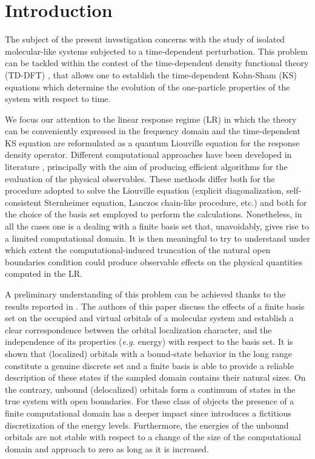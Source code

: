 \documentclass[reprint,aps,prb]{revtex4-1}
\begin{document}
\section{Introduction}

The subject of the present investigation concerns with the study of isolated molecular-like systems subjected to a time-dependent perturbation. %
This problem can be tackled within the contest of the time-dependent density functional theory (TD-DFT) \cite{runge1984,onida2002}, that allows one to establish the time-dependent 
Kohn-Sham (KS) equations which determine the evolution of the one-particle properties of the system with respect to time. 

We focus our attention to the linear response regime (LR) in which the theory can be conveniently expressed in the frequency domain and the time-dependent KS equation are reformulated 
as a quantum Liouville equation for the response density operator. Different computational approaches have been developed in literature \cite{baroni2008,hubener2014,brabec2015}, principally 
with the aim of producing efficient algorithms for the evaluation of the physical observables. These methods differ both for the procedure adopted to solve the Liouville equation 
(explicit diagonalization, self-consistent Sternheimer equation, Lanczos chain-like procedure, etc.) and both for the choice of the basis set employed to perform the calculations. 
Nonetheless, in all the cases one is a dealing with a finite basis set that, unavoidably, gives rise to a limited computational domain. It is then meaningful to try to understand under 
which extent the computational-induced truncation of the natural open boundaries condition could produce observable effects on the physical quantities computed in the LR. 

A preliminary understanding of this problem can be achieved thanks to the results reported in \cite{boffi2016}. The authors of this paper discuss the effects of a finite basis set on the 
occupied and virtual orbitals of a molecular system and establish a clear correspondence between the orbital localization character, and the independence of its properties (\emph{e.g.} energy) 
with respect to the basis set. It is shown that (localized) orbitals with a bound-state behavior in the long range constitute a genuine discrete set and a finite basis is 
able to provide a reliable description of these states if the sampled domain contains their natural sizes. On the contrary, unbound (delocalized) orbitals form a continuum of states in the 
true system with open boundaries. For these class of objects the presence of a finite computational domain has a deeper impact since introduces a fictitious discretization of the energy levels. 
Furthermore, the energies of the unbound orbitals are not stable with respect to a change of the size of the computational domain and approach to zero as long as it is increased.  
\end{document}
